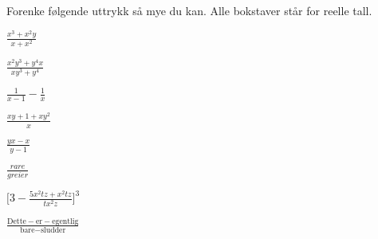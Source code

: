 \documentclass[a4paper,11pt]{article}
\begin{document}
\begin{problem}[4]
    Forenke følgende uttrykk så mye du kan. Alle bokstaver står for reelle
    tall.
    \begin{subproblem}{2}
        \item $\displaystyle \frac{x^3 + x^2 y}{x + x^2}$
        \label{subproblem:MAT-0001-Problem-1-x-4.a}
        \item $\displaystyle \frac{x^2 y^3 + y^4x}{xy^3 + y^4}$
        \label{subproblem:MAT-0001-Problem-1-x-4.b}
    \end{subproblem}
    \begin{subproblem}[3]{2}
        \item $\displaystyle \frac{1}{x - 1} - \frac{1}{x}$
        \label{subproblem:MAT-0001-Problem-1-x-4.c}
        \item $\displaystyle \frac{xy + 1 + xy^2}{x}$
        \label{subproblem:MAT-0001-Problem-1-x-4.d}
    \end{subproblem}
    \begin{subproblem}[5]{2}
        \item $\displaystyle \frac{yx - x}{y - 1}$
        \label{subproblem:MAT-0001-Problem-1-x-4.e}
        \item $\displaystyle \frac{rare}{greier}$
        \label{subproblem:MAT-0001-Problem-1-x-4.f}
    \end{subproblem}
    \begin{subproblem}[7]{2}
        \item $\displaystyle \biggr[3 - \frac{5x^2 tz + x^2 tz}{tx^2z}\biggl]^3$
        \label{subproblem:MAT-0001-Problem-1-x-4.g}
        \item $\displaystyle \frac{\text{Dette} - \text{er} - \text{egentlig}}{\text{bare} - \text{sludder}}$
        \label{subproblem:MAT-0001-Problem-1-x-4.h}
    \end{subproblem}
\end{problem}
\end{document}
